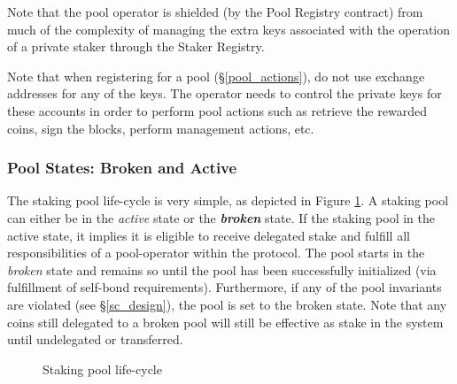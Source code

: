 Note that the pool operator is shielded (by the Pool Registry contract) from much of the complexity of managing the extra keys associated with the operation of a private staker through the Staker Registry. 

Note that when registering for a pool (\S\ref{pool_actions}), do not use exchange addresses for any of the keys. The operator needs to control the private keys for these accounts in order to perform pool actions such as retrieve the rewarded coins, sign the blocks, perform management actions, etc. 

\subsubsection{Pool States: Broken and Active} \label{pool_states}

The staking pool life-cycle is very simple, as depicted in Figure \ref{fig:pool_lifecycle}. A staking pool can either be in the \textit{active} state or the \textbf{\textit{broken}} state. If the staking pool in the active state, it implies it is eligible to receive delegated stake and fulfill all responsibilities of a pool-operator within the protocol. The pool starts in the \textit{broken} state and remains so until the pool has been successfully initialized (via fulfillment of self-bond requirements). Furthermore, if any of the pool invariants are violated (see \S\ref{sc_design}), the pool is set to the broken state. Note that any coins still delegated to a broken pool will still be effective as stake in the system until undelegated or transferred.  

\begin{figure}[ht]
\centering
{}
\begin{center}
\end{center}
\caption{Staking pool life-cycle}
\label{fig:pool_lifecycle}
\end{figure}

